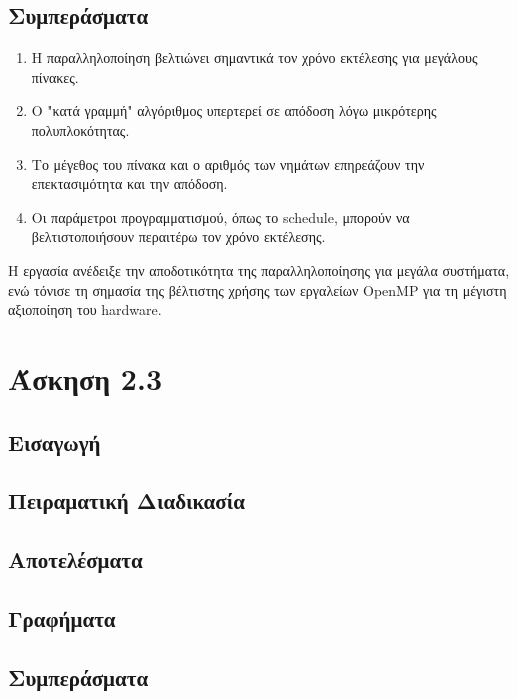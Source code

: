 \documentclass{article}
\begin{document}
\subsection*{Συμπεράσματα} 
\begin{enumerate} 
    \item Η παραλληλοποίηση βελτιώνει σημαντικά τον χρόνο εκτέλεσης για μεγάλους πίνακες. 
    \item Ο "κατά γραμμή" αλγόριθμος υπερτερεί σε απόδοση λόγω μικρότερης πολυπλοκότητας. 
    \item Το μέγεθος του πίνακα και ο αριθμός των νημάτων επηρεάζουν την επεκτασιμότητα και την απόδοση. 
    \item Οι παράμετροι προγραμματισμού, όπως το schedule, μπορούν να βελτιστοποιήσουν περαιτέρω τον χρόνο εκτέλεσης. 
\end{enumerate} 
Η εργασία ανέδειξε την αποδοτικότητα της παραλληλοποίησης για μεγάλα συστήματα, ενώ τόνισε τη σημασία της βέλτιστης χρήσης των εργαλείων OpenMP για τη μέγιστη αξιοποίηση του hardware.
\section*{Άσκηση 2.3}
\subsection*{Εισαγωγή}
\subsection*{Πειραματική Διαδικασία}
\subsection*{Αποτελέσματα}
\subsection*{Γραφήματα}
\subsection*{Συμπεράσματα}
\end{document}
